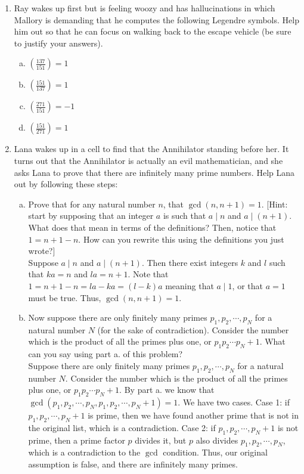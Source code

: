 \documentclass[12pt]{amsart}
\theoremstyle{plain}
\theoremstyle{definition}
\begin{document}
\begin{enumerate}[1.]
	\item Ray wakes up first but is feeling woozy and has hallucinations in which Mallory is demanding that he computes the following Legendre symbols.  Help him out so that he can focus on walking back to the escape vehicle (be sure to justify your answers).
		\begin{enumerate}[a.]
			\item $\left(\frac{137}{151}\right) = 1$
			
			\item $\left(\frac{151}{137}\right) = 1$
			
			\item $\left(\frac{271}{151}\right) = -1$
			
			\item $\left(\frac{151}{271}\right) = 1$\\
			
		\end{enumerate}
	\item Lana wakes up in a cell to find that the Annihilator standing before her.  It turns out that the Annihilator is actually an evil mathematician, and she asks Lana to prove that there are infinitely many prime numbers.  Help Lana out by following these steps:
		\begin{enumerate}[a.]
			\item Prove that for any natural number $n$, that $\gcd(n,n+1) = 1$.  [Hint: start by supposing that an integer $a$ is such that $a \mid n$ and $a \mid (n+1)$.  What does that mean in terms of the definitions?  Then, notice that $1 = n+1-n.$  How can you rewrite this using the definitions you just wrote?]\\
			
			Suppose $a \mid n$ and $a \mid (n+1)$.  Then there exist integers $k$ and $l$ such that $ka = n$ and $la = n+1$.  Note that $1 = n+1-n = la-ka = (l-k)a$ meaning that $a \mid 1$, or that $a = 1$ must be true.  Thus, $\gcd(n,n+1) = 1$.\\
			
			\item Now suppose there are only finitely many primes $p_1, p_2, \cdots, p_N$ for a natural number $N$ (for the sake of contradiction).  Consider the number which is the product of all the primes plus one, or $p_1p_2\cdots p_N+1$.  What can you say using part a. of this problem?\\
			
			Suppose there are only finitely many primes $p_1, p_2, \cdots, p_N$ for a natural number $N$.  Consider the number which is the product of all the primes plus one, or $p_1p_2\cdots p_N+1$. By part a. we know that $\gcd(p_1, p_2, \cdots, p_N,p_1, p_2, \cdots, p_N+1) = 1$.  We have two cases.  Case 1: if $p_1, p_2, \cdots, p_N+1$ is prime, then we have found another prime that is not in the original list, which is a contradiction.  Case 2: if $p_1, p_2, \cdots, p_N+1$ is not prime, then a prime factor $p$ divides it, but $p$ also divides $p_1, p_2, \cdots, p_N$, which is a contradiction to the $\gcd$ condition.  Thus, our original assumption is false, and there are infinitely many primes.\\
			

\end{enumerate}
\end{enumerate}
\end{document}
